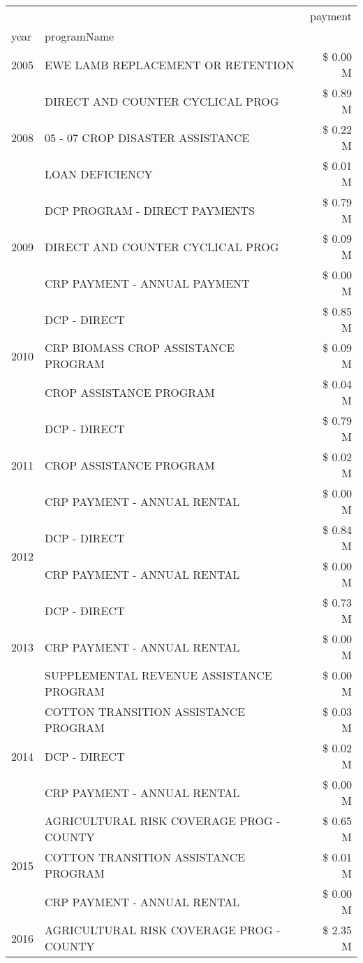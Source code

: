 \begin{tabular}{llr}
\toprule
 &  & payment \\
year & programName &  \\
\midrule
2005 & EWE LAMB REPLACEMENT OR RETENTION & \$ 0.00 M \\
\cline{1-3}
\multirow[t]{3}{*}{2008} & DIRECT AND COUNTER CYCLICAL PROG & \$ 0.89 M \\
 & 05 - 07 CROP DISASTER ASSISTANCE & \$ 0.22 M \\
 & LOAN DEFICIENCY & \$ 0.01 M \\
\cline{1-3}
\multirow[t]{3}{*}{2009} & DCP PROGRAM - DIRECT PAYMENTS & \$ 0.79 M \\
 & DIRECT AND COUNTER CYCLICAL PROG & \$ 0.09 M \\
 & CRP PAYMENT - ANNUAL PAYMENT & \$ 0.00 M \\
\cline{1-3}
\multirow[t]{3}{*}{2010} & DCP - DIRECT & \$ 0.85 M \\
 & CRP BIOMASS CROP ASSISTANCE PROGRAM & \$ 0.09 M \\
 & CROP ASSISTANCE PROGRAM & \$ 0.04 M \\
\cline{1-3}
\multirow[t]{3}{*}{2011} & DCP - DIRECT & \$ 0.79 M \\
 & CROP ASSISTANCE PROGRAM & \$ 0.02 M \\
 & CRP PAYMENT - ANNUAL RENTAL & \$ 0.00 M \\
\cline{1-3}
\multirow[t]{2}{*}{2012} & DCP - DIRECT & \$ 0.84 M \\
 & CRP PAYMENT - ANNUAL RENTAL & \$ 0.00 M \\
\cline{1-3}
\multirow[t]{3}{*}{2013} & DCP - DIRECT & \$ 0.73 M \\
 & CRP PAYMENT - ANNUAL RENTAL & \$ 0.00 M \\
 & SUPPLEMENTAL REVENUE ASSISTANCE PROGRAM & \$ 0.00 M \\
\cline{1-3}
\multirow[t]{3}{*}{2014} & COTTON TRANSITION ASSISTANCE PROGRAM & \$ 0.03 M \\
 & DCP - DIRECT & \$ 0.02 M \\
 & CRP PAYMENT - ANNUAL RENTAL & \$ 0.00 M \\
\cline{1-3}
\multirow[t]{3}{*}{2015} & AGRICULTURAL RISK COVERAGE PROG - COUNTY & \$ 0.65 M \\
 & COTTON TRANSITION ASSISTANCE PROGRAM & \$ 0.01 M \\
 & CRP PAYMENT - ANNUAL RENTAL & \$ 0.00 M \\
\cline{1-3}
\multirow[t]{3}{*}{2016} & AGRICULTURAL RISK COVERAGE PROG - COUNTY & \$ 2.35 M \\

\end{tabular}

